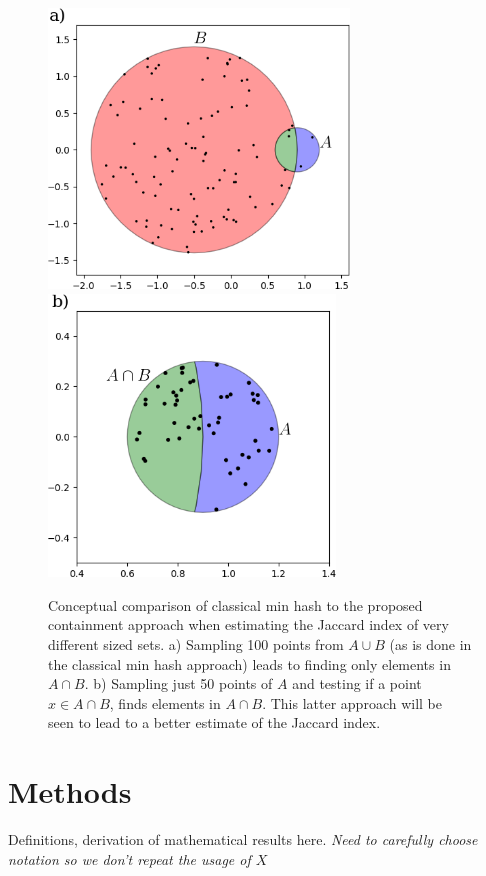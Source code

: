 \documentclass[11pt]{amsart}
\theoremstyle{remark}
\numberwithin{equation}{section}
\newcommand{\ClassicalConceptual}{\protect }
\newcommand{\ContainmentConceptual}{\protect }
\begin{document}
\begin{figure}[!h]%
\begin{center}
\includegraphics[width=3.15in,trim={0 0 0 0in},clip]{Figs/ClassicalConceptual.png}%
\hspace{1ex}
\includegraphics[width=3.0in,trim={0 0 0 0in},clip]{Figs/ContainmentConceptual.png}
\end{center}
\caption{Conceptual comparison of classical min hash to the proposed containment approach when estimating the Jaccard index of very different sized sets. a) Sampling 100 points from $A\cup B$ (as is done in the classical min hash approach) leads to finding only \ClassicalConceptual elements in $A\cap B$. b) Sampling just 50 points of $A$ and testing if a point $x\in A\cap B$, finds \ContainmentConceptual elements in $A\cap B$. This latter approach will be seen to lead to a better estimate of the Jaccard index. }
\label{fig:Conceptual}%
\end{figure}





\section{Methods}
Definitions, derivation of mathematical results here.
\emph{Need to carefully choose notation so we don't repeat the usage of $X$}
\end{document}
